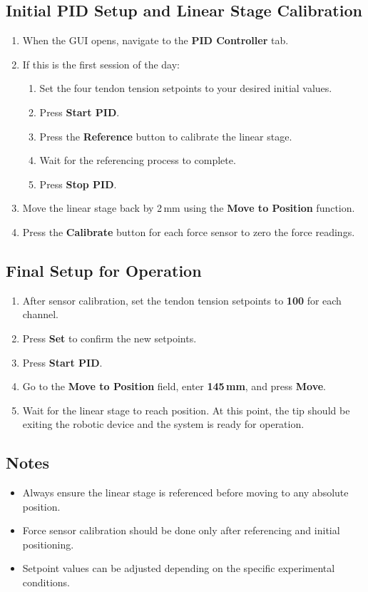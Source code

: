 \subsection*{Initial PID Setup and Linear Stage Calibration}

\begin{enumerate}[resume]
    \item When the GUI opens, navigate to the \textbf{PID Controller} tab.
    \item If this is the first session of the day:
    \begin{enumerate}
        \item Set the four tendon tension setpoints to your desired initial values.
        \item Press \textbf{Start PID}.
        \item Press the \textbf{Reference} button to calibrate the linear stage.
        \item Wait for the referencing process to complete.
        \item Press \textbf{Stop PID}.
    \end{enumerate}
    \item Move the linear stage back by 2\,mm using the \textbf{Move to Position} function.
    \item Press the \textbf{Calibrate} button for each force sensor to zero the force readings.
\end{enumerate}

\subsection*{Final Setup for Operation}

\begin{enumerate}[resume]
    \item After sensor calibration, set the tendon tension setpoints to \textbf{100} for each channel.
    \item Press \textbf{Set} to confirm the new setpoints.
    \item Press \textbf{Start PID}.
    \item Go to the \textbf{Move to Position} field, enter \textbf{145\,mm}, and press \textbf{Move}.
    \item Wait for the linear stage to reach position. At this point, the tip should be exiting the robotic device and the system is ready for operation.
\end{enumerate}

\subsection*{Notes}
\begin{itemize}
    \item Always ensure the linear stage is referenced before moving to any absolute position.
    \item Force sensor calibration should be done only after referencing and initial positioning.
    \item Setpoint values can be adjusted depending on the specific experimental conditions.
\end{itemize}


